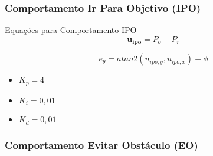 \begin{frame}
	\frametitle{Comportamento Ir Para Objetivo (IPO)}
	
\end{frame}

\begin{frame}
	\begin{exampleblock}{Equações para Comportamento IPO}
		\begin{equation}
			\mathbf{u_{ipo}} = P_o - P_r
		\end{equation}
		
		\pause
		\begin{equation}
			e_\theta = atan2(u_{ipo,y}, u_{ipo,x}) - \phi
		\end{equation}
		
		\pause
		\begin{itemize}
		  \item $K_p = 4$
		  \pause
		  \item $K_i = 0,01$
		  \pause
		  \item $K_d = 0,01$
		\end{itemize}
	\end{exampleblock}
\end{frame}

\begin{frame}
	\frametitle{Comportamento Evitar Obstáculo (EO)}
	
\end{frame}

